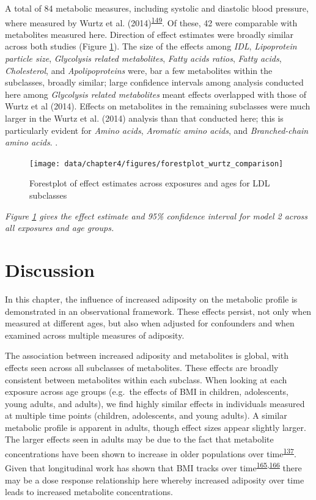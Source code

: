 \documentclass[11pt,twoside]{bristolthesis}
\newcommand{\blandscape}{\begin{landscape}}
\newcommand{\elandscape}{\end{landscape}}
\newcommand{\bsmall}{\begin{small}}
\newcommand{\esmall}{\end{small}}
\begin{document}
A total of 84 metabolic measures, including systolic and diastolic blood pressure, where measured by Wurtz et al. (2014)\textsuperscript{\protect\hyperlink{ref-Wurtz2014}{149}}. Of these, 42 were comparable with metabolites measured here. Direction of effect estimates were broadly similar across both studies (Figure \ref{fig:chapter4-figure-forestplot-wurtz-comparison}). The size of the effects among \emph{IDL}, \emph{Lipoprotein particle size}, \emph{Glycolysis related metabolites}, \emph{Fatty acids ratios}, \emph{Fatty acids}, \emph{Cholesterol}, and \emph{Apolipoproteins} were, bar a few metabolites within the subclasses, broadly similar; large confidence intervals among analysis conducted here among \emph{Glycolysis related metabolites} meant effects overlapped with those of Wurtz et al (2014). Effects on metabolites in the remaining subclasses were much larger in the Wurtz et al. (2014) analysis than that conducted here; this is particularly evident for \emph{Amino acids}, \emph{Aromatic amino acids}, and \emph{Branched-chain amino acids}. .

\blandscape
\begin{figure}
\texttt{[image: data/chapter4/figures/forestplot\_wurtz\_comparison]} \caption{Forestplot of effect estimates across exposures and ages for LDL subclasses}\label{fig:chapter4-figure-forestplot-wurtz-comparison}
\end{figure}
\noindent 
\bsmall
\emph{Figure \ref{fig:chapter4-figure-forestplot-wurtz-comparison} gives the effect estimate and 95\% confidence interval for model 2 across all exposures and age groups.}
\esmall
\elandscape
\newpage

\hypertarget{discussion}{%
\section{Discussion}\label{discussion}}

In this chapter, the influence of increased adiposity on the metabolic profile is demonstrated in an observational framework. These effects persist, not only when measured at different ages, but also when adjusted for confounders and when examined across multiple measures of adiposity.

The association between increased adiposity and metabolites is global, with effects seen across all subclasses of metabolites. These effects are broadly consistent between metabolites within each subclass. When looking at each exposure across age groups (e.g.~the effects of BMI in children, adolescents, young adults, and adults), we find highly similar effects in individuals measured at multiple time points (children, adolescents, and young adults). A similar metabolic profile is apparent in adults, though effect sizes appear slightly larger. The larger effects seen in adults may be due to the fact that metabolite concentrations have been shown to increase in older populations over time\textsuperscript{\protect\hyperlink{ref-Darst2019}{137}}. Given that longitudinal work has shown that BMI tracks over time\textsuperscript{\protect\hyperlink{ref-Singh2008}{165},\protect\hyperlink{ref-Buscot2018}{166}} there may be a dose response relationship here whereby increased adiposity over time leads to increased metabolite concentrations.
\end{document}

